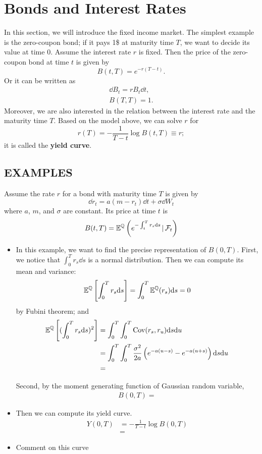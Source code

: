 \section{Bonds and Interest Rates} 
In this section, we will introduce the fixed income market. The simplest example is the zero-coupon bond; if it pays 1\$ at maturity time $T$, we want to decide its value at time $0$. Assume the interest rate $r$ is fixed. Then the price of the zero-coupon bond at time $t$ is given by
$$B(t, T) = e^{ -r(T-t) }.$$
Or it can be written as
\begin{align*}
	\dd B_t = r B_t \dd t, \\
	B(T,T) = 1.
\end{align*}
Moreover, we are also interested in the relation between the interest rate and the maturity time $T$. Based on the model above, we can solve $r$ for 
$$r(T) = - \frac{1}{T- t}\log B(t,T) \equiv r;$$
it is called the \textbf{yield curve}. 


\subsection*{EXAMPLES}

\begin{example}
	Assume the rate $r$ for a bond with maturity time $T$ is given by
	$$\dd r_t = a(m - r_t)\dd t + \sigma \dd W_t$$
	where $a$, $m$, and $\sigma$ are constant. Its price at time $t$ is
	$$B(t,T) = \mathbb{E}^{\mathbb{Q}} \left(  e^{-\int^T_t r_s \mathrm{d} s} \hspace{1.5pt} | \hspace{1.5pt} \mathcal{F}_t  \right)$$
	\begin{itemize}
		\item In this example, we want to find the precise representation of $B(0,T)$. First, we notice that $\int^T_0 r_s \dd s$ is a normal distribution. Then we can compute its mean and variance:
		\begin{align*}
			\mathbb{E}^{\mathbb{Q}} \left[ \int^T_0 r_s \mathrm{d} s  \right] =    \int^T_0  \mathbb{E}^{\mathbb{Q}}(r_s) \mathrm{d} s  = 0 
		\end{align*}
		by Fubini theorem; and 
		\begin{align*}
			\mathbb{E}^{\mathbb{Q}} \left[ (\int^T_0 r_s \mathrm{d} s )^2 \right] &= \int^T_0 \int^T_0 \mathrm{Cov}( r_s, r_u ) \mathrm{d} s \mathrm{d} u \\
			&= \int^T_0 \int^T_0  \frac{\sigma^2}{2a}\left( e^{-a(u-s)} - e^{-a(u+s)} \right) \mathrm{d} s \mathrm{d} u \\
			&= 
		\end{align*}
		
		Second, by the moment generating function of Gaussian random variable, 
		\begin{align*}
			B(0, T) = 
		\end{align*}
		
		\item Then we can compute its yield curve.
		\begin{align*}
			Y(0, T) &= -\frac{1}{T - t} \log B(0, T) \\
			&=
		\end{align*}
		
		\item Comment on this curve
	\end{itemize}
\end{example}

